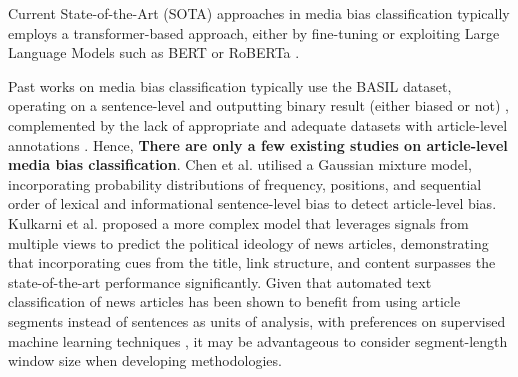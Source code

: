 Current State-of-the-Art (SOTA) approaches in media bias classification typically employs a transformer-based approach, either by fine-tuning or exploiting Large Language Models such as BERT \cite{devlin-2019-bert} or RoBERTa \cite{liu-2019-roberta}.

Past works on media bias classification typically use the BASIL dataset, operating on a sentence-level and outputting binary result (either biased or not) \cite{maab-2023-lexical-bias-detection, maab-2023-target-aware, guo-2022-modeling, van-den-berg-2020-context,lee-2021-unifying,lei-2022-sentence,lei-2024-event-relation}, complemented by the lack of appropriate and adequate datasets with article-level annotations \cite{demidov-2023-political-bias-classification}. Hence, \textbf{There are only a few existing studies on article-level media bias classification}. Chen et al. \cite{chen-2020-detecting-media-bias-gaussian} utilised a Gaussian mixture model, incorporating probability distributions of frequency, positions, and sequential order of lexical and informational sentence-level bias to detect article-level bias. Kulkarni et al. \cite{kulkarni-2018-multi-view} proposed a more complex model that leverages signals from multiple views to predict the political ideology of news articles, demonstrating that incorporating cues from the title, link structure, and content surpasses the state-of-the-art performance significantly. Given that automated text classification of news articles has been shown to benefit from using article segments instead of sentences as units of analysis, with preferences on supervised machine learning techniques \cite{barbera-2021-article-classification}, it may be advantageous to consider segment-length window size when developing methodologies.


